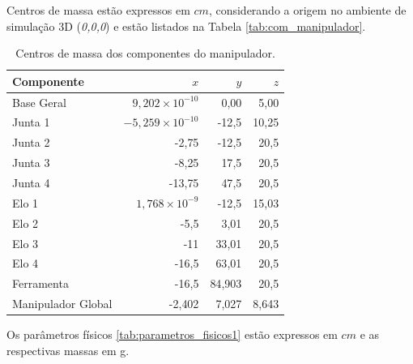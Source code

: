 Centros de massa estão expressos em $cm$, considerando a origem no ambiente de simulação 3D (\emph{0,0,0}) e estão listados na Tabela \eqref{tab:com_manipulador}.

\begin{table}[H]
\centering
\caption{Centros de massa dos componentes do manipulador.}
\label{tab:com_manipulador}
\begin{tabular}{lrrr}
\toprule
Componente & $x$ & $y$ & $z$ \\
\midrule
Base Geral   & $9{,}202\times 10^{-10}$  & 0{,}00   & 5{,}00 \\
Junta 1      & $-5{,}259\times 10^{-10}$ & -12{,}5  & 10{,}25 \\
Junta 2      & -2{,}75                   & -12{,}5  & 20{,}5 \\
Junta 3      & -8{,}25                   & 17{,}5   & 20{,}5 \\
Junta 4      & -13{,}75                  & 47{,}5   & 20{,}5 \\
Elo 1        & $1{,}768\times 10^{-9}$   & -12{,}5  & 15{,}03 \\
Elo 2        & -5{,}5                    & 3{,}01   & 20{,}5 \\
Elo 3        & -11                       & 33{,}01  & 20{,}5 \\
Elo 4        & -16{,}5                   & 63{,}01  & 20{,}5 \\
Ferramenta   & -16{,}5                   & 84{,}903 & 20{,}5 \\
Manipulador Global & -2{,}402            & 7{,}027  & 8{,}643 \\
\bottomrule
\end{tabular}
\end{table}

Os parâmetros físicos
\eqref{tab:parametros_fisicos1}
estão expressos em $cm$ e as respectivas massas em g.

